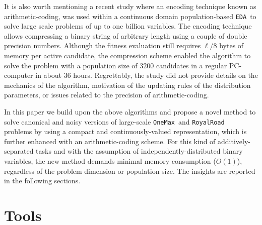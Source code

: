 \documentclass{sig-alternate}
\newcommand{\EDA}{\texttt{EDA}}
\newcommand{\onemax}{\texttt{OneMax}}
\newcommand{\rroad}{\texttt{RoyalRoad}}
\begin{document}
It is also worth mentioning a recent study\cite{Suwannik08} where an encoding technique known as arithmetic-coding\cite{Said04}, was used within a continuous domain population-based \EDA~to solve large scale problems of up to one billion variables. The encoding technique allows compressing a binary string of arbitrary length using a couple of double precision numbers. Although the fitness evaluation still requires $\ell/8$ bytes of memory per active candidate, the compression scheme enabled the algorithm to solve the problem with a population size of $3200$ candidates in a regular PC-computer in about 36 hours. Regrettably, the study did not provide details on the mechanics of the algorithm, motivation of the updating rules of the distribution parameters, or issues related to the precision of arithmetic-coding.

In this paper we build upon the above algorithms and propose a novel method to solve canonical and noisy versions of large-scale \onemax~and \rroad~ problems by using a compact and continuously-valued representation, which is further enhanced with an arithmetic-coding scheme. For this kind of additively-separated tasks and with the assumption of independently-distributed binary variables, the new method demands minimal memory consumption ($O(1)$), regardless of the problem dimension or population size. The insights are reported in the following sections.

\section{Tools}
\label{sec:tools}
\end{document}
